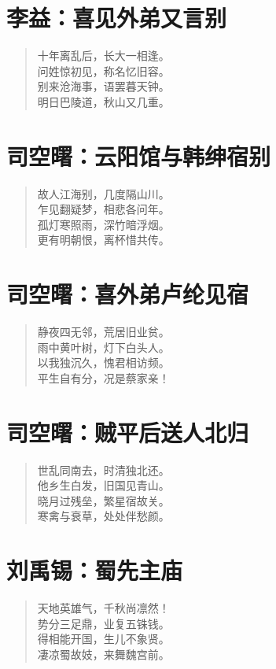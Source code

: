 \documentclass[12pt,oneside]{book}
\newenvironment{shici}{
\begin{verse}
\centering\large\hspace{12pt}}
{\end{verse}}
\begin{document}
\chapter{李益：喜见外弟又言别}
\begin{shici}
十年离乱后，长大一相逢。\\
问姓惊初见，称名忆旧容。\\
别来沧海事，语罢暮天钟。\\
明日巴陵道，秋山又几重。
\end{shici}

\chapter{司空曙：云阳馆与韩绅宿别}
\begin{shici}
故人江海别，几度隔山川。\\
乍见翻疑梦，相悲各问年。\\
孤灯寒照雨，深竹暗浮烟。\\
更有明朝恨，离杯惜共传。
\end{shici}

\chapter{司空曙：喜外弟卢纶见宿}
\begin{shici}
静夜四无邻，荒居旧业贫。\\
雨中黄叶树，灯下白头人。\\
以我独沉久，愧君相访频。\\
平生自有分，况是蔡家亲！
\end{shici}

\chapter{司空曙：贼平后送人北归}
\begin{shici}
世乱同南去，时清独北还。\\
他乡生白发，旧国见青山。\\
晓月过残垒，繁星宿故关。\\
寒禽与衰草，处处伴愁颜。
\end{shici}

\chapter{刘禹锡：蜀先主庙}
\begin{shici}
天地英雄气，千秋尚凛然！\\
势分三足鼎，业复五铢钱。\\
得相能开国，生儿不象贤。\\
凄凉蜀故妓，来舞魏宫前。
\end{shici}
\end{document}
